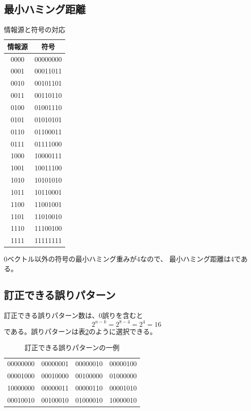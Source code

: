 \documentclass[a4paper,11pt]{jsarticle}
\begin{document}
\subsection{最小ハミング距離}

\begin{table}[hbtp]
  \caption{情報源と符号の対応}
  \label{table:all-code}
  \centering
  \begin{tabular}{|cc|}
    \hline
    情報源 & 符号 \\ \hline \hline
    0000 & 00000000 \\ \hline
    0001 & 00011011 \\ \hline
    0010 & 00101101 \\ \hline
    0011 & 00110110 \\ \hline
    0100 & 01001110 \\ \hline
    0101 & 01010101 \\ \hline
    0110 & 01100011 \\ \hline
    0111 & 01111000 \\ \hline
    1000 & 10000111 \\ \hline
    1001 & 10011100 \\ \hline
    1010 & 10101010 \\ \hline
    1011 & 10110001 \\ \hline
    1100 & 11001001 \\ \hline
    1101 & 11010010 \\ \hline
    1110 & 11100100 \\ \hline
    1111 & 11111111 \\ \hline
  \end{tabular}
\end{table}

0ベクトル以外の符号の最小ハミング重みが4なので、
最小ハミング距離は4である。

\subsection{訂正できる誤りパターン}
訂正できる誤りパターン数は、0誤りを含むと
\begin{equation*}
  2^{n-k}=2^{8-4}=2^4=16
\end{equation*}
である。誤りパターンは表\ref{table:error-pattern}のように選択できる。

\begin{table}[hbtp]
  \caption{訂正できる誤りパターンの一例}
  \label{table:error-pattern}
  \centering
  \begin{tabular}{cccc}
    00000000 & 00000001 & 00000010 & 00000100 \\
    00001000 & 00010000 & 00100000 & 01000000 \\
    10000000 & 00000011 & 00000110 & 00001010 \\
    00010010 & 00100010 & 01000010 & 10000010
  \end{tabular}
\end{table}
\end{document}
